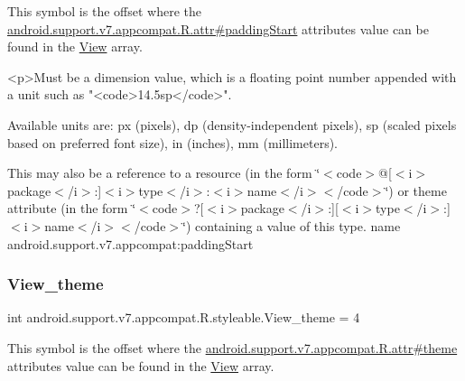 This symbol is the offset where the \hyperlink{classandroid_1_1support_1_1v7_1_1appcompat_1_1R_1_1attr_ad5d87fd81512a9d000e393f93e56bfd4}{android.\+support.\+v7.\+appcompat.\+R.\+attr\#padding\+Start} attribute\textquotesingle{}s value can be found in the \hyperlink{classandroid_1_1support_1_1v7_1_1appcompat_1_1R_1_1styleable_a0105bc03f2606ae1fc5f05a515d81b3c}{View} array.

\begin{DoxyVerb}      <p>Must be a dimension value, which is a floating point number appended with a unit such as "<code>14.5sp</code>".
\end{DoxyVerb}
 Available units are\+: px (pixels), dp (density-\/independent pixels), sp (scaled pixels based on preferred font size), in (inches), mm (millimeters). 

This may also be a reference to a resource (in the form \char`\"{}$<$code$>$@\mbox{[}$<$i$>$package$<$/i$>$\+:\mbox{]}$<$i$>$type$<$/i$>$\+:$<$i$>$name$<$/i$>$$<$/code$>$\char`\"{}) or theme attribute (in the form \char`\"{}$<$code$>$?\mbox{[}$<$i$>$package$<$/i$>$\+:\mbox{]}\mbox{[}$<$i$>$type$<$/i$>$\+:\mbox{]}$<$i$>$name$<$/i$>$$<$/code$>$\char`\"{}) containing a value of this type.  name android.\+support.\+v7.\+appcompat\+:padding\+Start \mbox{\label{classandroid_1_1support_1_1v7_1_1appcompat_1_1R_1_1styleable_a12b9f90d53fd9f125f955389e1951751}} 
\subsubsection{\texorpdfstring{View\+\_\+theme}{View\_theme}}
{\footnotesize\ttfamily int android.\+support.\+v7.\+appcompat.\+R.\+styleable.\+View\+\_\+theme = 4\hspace{0.3cm}{\ttfamily [static]}}

This symbol is the offset where the \hyperlink{classandroid_1_1support_1_1v7_1_1appcompat_1_1R_1_1attr_a5f9d0e2c4bd6328154d79803aa7c78b6}{android.\+support.\+v7.\+appcompat.\+R.\+attr\#theme} attribute\textquotesingle{}s value can be found in the \hyperlink{classandroid_1_1support_1_1v7_1_1appcompat_1_1R_1_1styleable_a0105bc03f2606ae1fc5f05a515d81b3c}{View} array.

